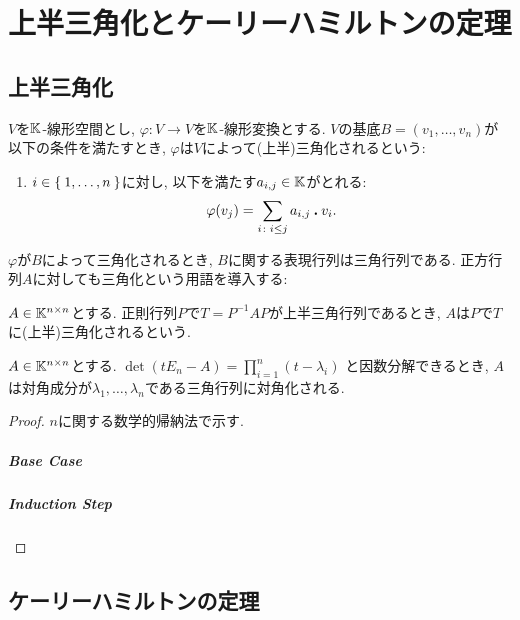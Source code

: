 \begin{quiz}
\end{quiz}

\chapter{上半三角化とケーリーハミルトンの定理}

\section{上半三角化}

\begin{definition}
$V$を$\mathbb{K}$-線形空間とし,
$\varphi\colon V\to V$を$\mathbb{K}$-線形変換とする.
$V$の基底$B=(v_1,\ldots,v_n)$が以下の条件を満たすとき,
$\varphi$は$V$によって(上半)三角化されるという:
\begin{enumerate}
\item
$i\in\Set{1,\ldots,n}$に対し,
以下を満たす$a_{i,j}\in\mathbb{K}$がとれる:
\begin{align*}
\varphi(v_j)=\sum_{i\colon i\leq j }a_{i,j}\mathbin{\boldsymbol{.}} v_i.
\end{align*}
\end{enumerate}
\end{definition}
$\varphi$が$B$によって三角化されるとき,
$B$に関する表現行列は三角行列である.
正方行列$A$に対しても三角化という用語を導入する:
\begin{definition}
$A\in \mathbb{K}^{n\times n}$とする.
正則行列$P$で$T=P^{-1}AP$が上半三角行列であるとき,
$A$は$P$で$T$に(上半)三角化されるという.
\end{definition}

\begin{prop}
$A\in \mathbb{K}^{n\times n}$とする.
$\det(tE_n-A)=\prod_{i=1}^n (t-\lambda_i)$
と因数分解できるとき,
$A$は対角成分が$\lambda_1,\ldots,\lambda_n$である三角行列に対角化される.
\end{prop}
\begin{proof}
$n$に関する数学的帰納法で示す.
\paragraph{Base Case}
\paragraph{Induction Step}
\end{proof}


\section{ケーリーハミルトンの定理}

